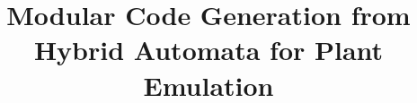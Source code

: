 \documentclass[conference]{IEEEtran}
\begin{document}
	
\title{Modular Code Generation from Hybrid Automata for Plant Emulation }

\author{
}





\maketitle
\end{document}
